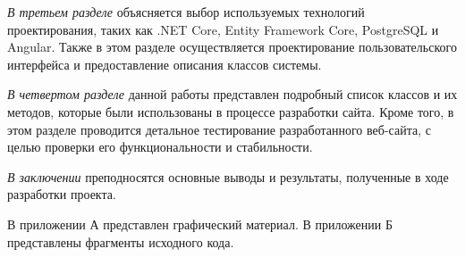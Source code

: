 \emph{В третьем разделе} объясняется выбор используемых технологий проектирования, таких как .NET Core, Entity Framework Core, PostgreSQL и Angular. Также в этом разделе осуществляется проектирование пользовательского интерфейса и предоставление описания классов системы.

\emph{В четвертом разделе} данной работы представлен подробный список классов и их методов, которые были использованы в процессе разработки сайта. Кроме того, в этом разделе проводится детальное тестирование разработанного веб-сайта, с целью проверки его функциональности и стабильности.

\emph{В заключении} преподносятся основные выводы и результаты, полученные в ходе разработки проекта.

В приложении А представлен графический материал.
В приложении Б представлены фрагменты исходного кода. 
